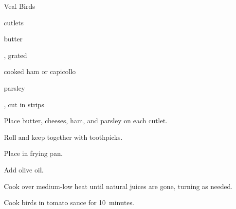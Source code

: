 \begin{recipe}{Veal Birds}{}{}

\begin{ingredients}
\item {} cutlets
\item butter
\item {}, grated
\item cooked ham or capicollo
\item parsley
\item {}, cut in strips
\item {}
\end{ingredients}

\begin{directions}
\item Place butter, cheeses, ham, and parsley on each cutlet.
\item Roll and keep together with toothpicks.
\item Place in frying pan.
\item Add olive oil.
\item Cook over medium-low heat until natural juices are gone, turning as needed.
\item Cook birds in tomato sauce for 10~minutes.
\end{directions}

\end{recipe}
